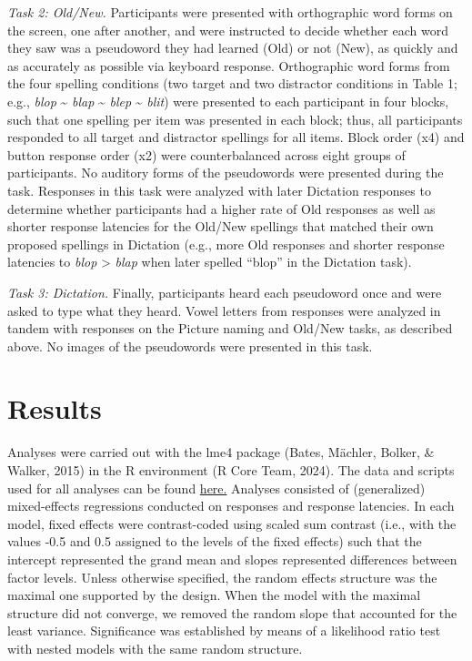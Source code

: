 \documentclass[
  english,
  man,floatsintext]{apa7}
\begin{document}
\emph{Task 2: Old/New.} Participants were presented with orthographic word forms on the screen, one after another, and were instructed to decide whether each word they saw was a pseudoword they had learned (Old) or not (New), as quickly and as accurately as possible via keyboard response. Orthographic word forms from the four spelling conditions (two target and two distractor conditions in Table 1; e.g., \emph{blop} \textasciitilde{} \emph{blap} \textasciitilde{} \emph{blep} \textasciitilde{} \emph{blit}) were presented to each participant in four blocks, such that one spelling per item was presented in each block; thus, all participants responded to all target and distractor spellings for all items. Block order (x4) and button response order (x2) were counterbalanced across eight groups of participants. No auditory forms of the pseudowords were presented during the task. Responses in this task were analyzed with later Dictation responses to determine whether participants had a higher rate of Old responses as well as shorter response latencies for the Old/New spellings that matched their own proposed spellings in Dictation (e.g., more Old responses and shorter response latencies to \emph{blop} \textgreater{} \emph{blap} when later spelled ``blop'' in the Dictation task).

\emph{Task 3: Dictation.} Finally, participants heard each pseudoword once and were asked to type what they heard. Vowel letters from responses were analyzed in tandem with responses on the Picture naming and Old/New tasks, as described above. No images of the pseudowords were presented in this task.

\section{Results}\label{results}

Analyses were carried out with the lme4 package (Bates, Mächler, Bolker, \& Walker, 2015) in the R environment (R Core Team, 2024). The data and scripts used for all analyses can be found \href{https://github.com/anonautforsub4556743/Ortho-knowledge-auditory-L2-word-learning}{here.} Analyses consisted of (generalized) mixed-effects regressions conducted on responses and response latencies. In each model, fixed effects were contrast-coded using scaled sum contrast (i.e., with the values -0.5 and 0.5 assigned to the levels of the fixed effects) such that the intercept represented the grand mean and slopes represented differences between factor levels. Unless otherwise specified, the random effects structure was the maximal one supported by the design. When the model with the maximal structure did not converge, we removed the random slope that accounted for the least variance. Significance was established by means of a likelihood ratio test with nested models with the same random structure.
\end{document}
